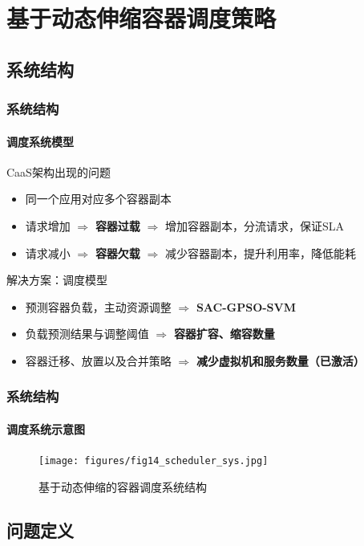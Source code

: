 \section{基于动态伸缩容器调度策略}

\subsection{系统结构}

\begin{frame}
\frametitle{系统结构}
\framesubtitle{调度系统模型}
\begin{block}{CaaS架构出现的问题}
\begin{itemize}
    \item 同一个应用对应多个容器副本
    \item 请求增加 $\Rightarrow$ \textbf{容器过载} $\Rightarrow$ 增加容器副本，分流请求，保证SLA
    \item 请求减小 $\Rightarrow$ \textbf{容器欠载} $\Rightarrow$ 减少容器副本，提升利用率，降低能耗
\end{itemize}
\end{block}
\begin{exampleblock}{解决方案：调度模型}
\begin{itemize}
    \item {\color{gray}预测容器负载，主动资源调整 $\Rightarrow$ \textbf{SAC-GPSO-SVM}}
    \item 负载预测结果与调整阈值 $\Rightarrow$ \textbf{容器扩容、缩容数量}
    \item 容器迁移、放置以及合并策略 $\Rightarrow$ \textbf{减少虚拟机和服务数量（已激活）}
\end{itemize}
\end{exampleblock}
\end{frame}

\begin{frame}
\frametitle{系统结构}
\framesubtitle{调度系统示意图}
\begin{figure}[htb]
    \centering
    \texttt{[image: figures/fig14\_scheduler\_sys.jpg]}
    \caption{基于动态伸缩的容器调度系统结构}
    \label{fig:fig14}
\end{figure}
\bigskip
\end{frame}

\subsection{问题定义}

